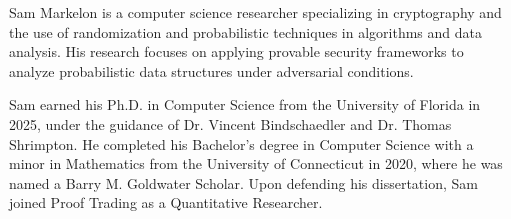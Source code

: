 


Sam Markelon is a computer science researcher specializing in cryptography and the use of randomization and probabilistic techniques in algorithms and data analysis. His research focuses on applying provable security frameworks to analyze probabilistic data structures under adversarial conditions.

Sam earned his Ph.D. in Computer Science from the University of Florida in 2025, under the guidance of Dr. Vincent Bindschaedler and Dr. Thomas Shrimpton. He completed his Bachelor’s degree in Computer Science with a minor in Mathematics from the University of Connecticut in 2020, where he was named a Barry M. Goldwater Scholar. Upon defending his dissertation, Sam joined Proof Trading as a Quantitative Researcher.
